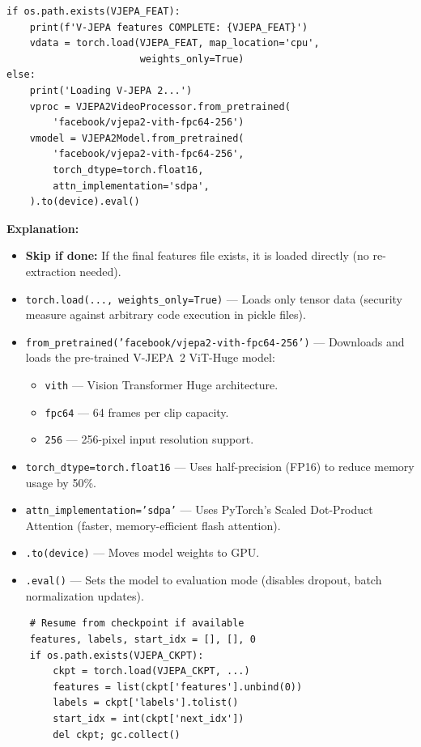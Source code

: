 \documentclass[a4paper, 12pt]{article}
\newenvironment{explanation}{%
  \par\smallskip
  \noindent\textcolor{blue!70!black}{\textbf{Explanation:}}\\
  \noindent
}{\par\medskip}
\begin{document}
\begin{lstlisting}
if os.path.exists(VJEPA_FEAT):
    print(f'V-JEPA features COMPLETE: {VJEPA_FEAT}')
    vdata = torch.load(VJEPA_FEAT, map_location='cpu',
                       weights_only=True)
else:
    print('Loading V-JEPA 2...')
    vproc = VJEPA2VideoProcessor.from_pretrained(
        'facebook/vjepa2-vith-fpc64-256')
    vmodel = VJEPA2Model.from_pretrained(
        'facebook/vjepa2-vith-fpc64-256',
        torch_dtype=torch.float16,
        attn_implementation='sdpa',
    ).to(device).eval()
\end{lstlisting}

\begin{explanation}
\begin{itemize}[nosep]
  \item \textbf{Skip if done:} If the final features file exists, it is loaded directly (no re-extraction needed).
  \item \texttt{torch.load(..., weights\_only=True)} --- Loads only tensor data (security measure against arbitrary code execution in pickle files).
  \item \texttt{from\_pretrained('facebook/vjepa2-vith-fpc64-256')} --- Downloads and loads the pre-trained V-JEPA~2 ViT-Huge model:
  \begin{itemize}[nosep]
    \item \texttt{vith} --- Vision Transformer Huge architecture.
    \item \texttt{fpc64} --- 64 frames per clip capacity.
    \item \texttt{256} --- 256-pixel input resolution support.
  \end{itemize}
  \item \texttt{torch\_dtype=torch.float16} --- Uses half-precision (FP16) to reduce memory usage by 50\%.
  \item \texttt{attn\_implementation='sdpa'} --- Uses PyTorch's Scaled Dot-Product Attention (faster, memory-efficient flash attention).
  \item \texttt{.to(device)} --- Moves model weights to GPU.
  \item \texttt{.eval()} --- Sets the model to evaluation mode (disables dropout, batch normalization updates).
\end{itemize}
\end{explanation}

\begin{lstlisting}
    # Resume from checkpoint if available
    features, labels, start_idx = [], [], 0
    if os.path.exists(VJEPA_CKPT):
        ckpt = torch.load(VJEPA_CKPT, ...)
        features = list(ckpt['features'].unbind(0))
        labels = ckpt['labels'].tolist()
        start_idx = int(ckpt['next_idx'])
        del ckpt; gc.collect()
\end{lstlisting}
\end{document}
